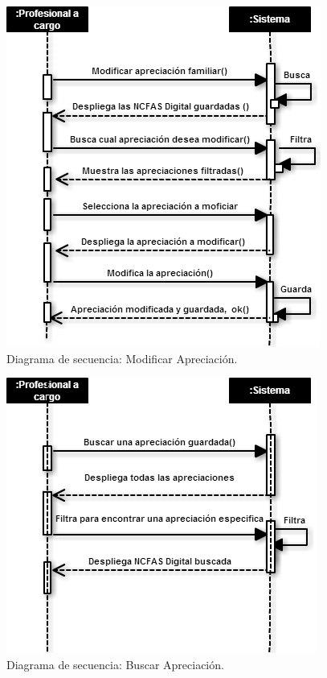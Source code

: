 \begin{figure}[htb]
	\label{dss5}
	\begin{center}
		\includegraphics[scale=0.5]{imagenes/modificarncfas.png}
	\end{center}
	\caption{Diagrama de secuencia: Modificar Apreciación.}
\end{figure}


\begin{figure}[htb]
	\label{dss6}
	\begin{center}
		\includegraphics[scale=0.5]{imagenes/buscar.png}
	\end{center}
	\caption{Diagrama de secuencia: Buscar Apreciación.}
\end{figure}


